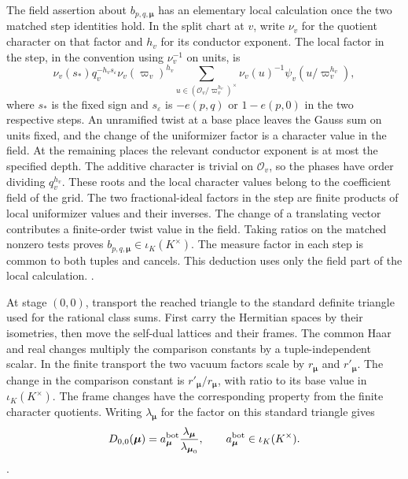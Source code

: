 The field assertion about \(b_{p,q,\boldsymbol\mu}\) has an elementary
local calculation once the two matched step identities hold. In the
split chart at \(v\), write \(\nu_v\) for the quotient character on
that factor and \(h_v\) for its conductor exponent. The local factor
in the step, in the convention using \(\nu_v^{-1}\) on units, is
\[
  \nu_v(s_*)q_v^{-h_v s_\varepsilon}\nu_v(\varpi_v)^{h_v}
    \sum_{u\in(\mathcal O_v/\varpi_v^{h_v})^\times}
           \nu_v(u)^{-1}\psi_v(u/\varpi_v^{h_v}),
\]
where \(s_*\) is the fixed sign and \(s_\varepsilon\) is
\(-e(p,q)\) or \(1-e(p,0)\) in the two respective steps. An
unramified twist at a base place leaves the Gauss sum on units fixed,
and the change of the uniformizer factor is a character value in the
field. At the remaining places the relevant conductor exponent is at
most the specified depth. The additive character is trivial on
\(\mathcal O_v\), so the phases have order dividing \(q_v^{h_v}\).
These roots and the local character values belong to the coefficient
field of the grid. The two fractional-ideal factors in the step are
finite products of local uniformizer values and their inverses. The
change of a translating vector contributes a finite-order twist value
in the field. Taking ratios on the matched nonzero tests proves
\(b_{p,q,\boldsymbol\mu}\in\iota_K(K^\times)\). The measure factor in
each step is common to both tuples and cancels. This deduction uses
only the field part of the local calculation.
.

At stage \((0,0)\), transport the reached triangle to the standard
definite triangle used for the rational class sums. First carry the
Hermitian spaces by their isometries, then move the self-dual lattices
and their frames. The common Haar and real changes multiply the
comparison constants by a tuple-independent scalar. In the finite
transport the two vacuum factors scale by \(r_{\boldsymbol\mu}\) and
\(r'_{\boldsymbol\mu}\). The change in the comparison constant is
\(r'_{\boldsymbol\mu}/r_{\boldsymbol\mu}\), with ratio to its base value
in \(\iota_K(K^\times)\). The frame changes have the corresponding
property from the finite character quotients. Writing
\(\lambda_{\boldsymbol\mu}\) for the factor on this standard triangle
gives
\[
   D_{0,0}(\boldsymbol\mu)
       =a^{\rm bot}_{\boldsymbol\mu}
                 \frac{\lambda_{\boldsymbol\mu}}{\lambda_{\boldsymbol\mu_0}},
   \qquad a^{\rm bot}_{\boldsymbol\mu}\in\iota_K(K^\times).
\]
.


